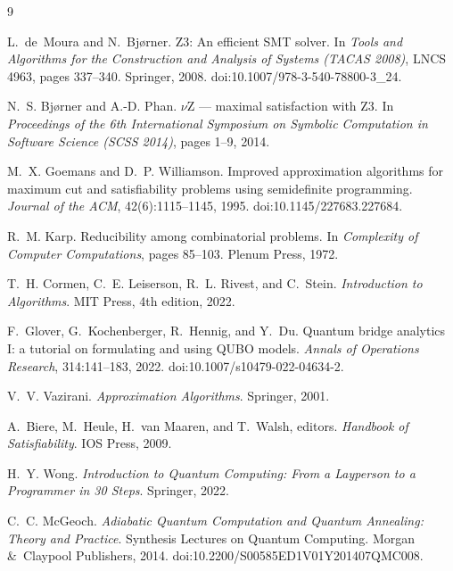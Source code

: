 \documentclass[12pt, a4paper]{article}
\theoremstyle{remark}
\begin{document}
\begin{thebibliography}{9}

L.~de~Moura and N.~Bj{\o}rner.
\newblock Z3: An efficient {SMT} solver.
\newblock In \textit{Tools and Algorithms for the Construction and Analysis of
  Systems (TACAS 2008)}, LNCS 4963, pages 337--340. Springer, 2008.
\newblock doi:10.1007/978-3-540-78800-3\_24.

N.~S. Bj{\o}rner and A.-D. Phan.
\newblock $\nu${Z} --- maximal satisfaction with {Z3}.
\newblock In \textit{Proceedings of the 6th International Symposium on
  Symbolic Computation in Software Science (SCSS 2014)}, pages 1--9, 2014.

M.~X. Goemans and D.~P. Williamson.
\newblock Improved approximation algorithms for maximum cut and satisfiability
  problems using semidefinite programming.
\newblock \textit{Journal of the ACM}, 42(6):1115--1145, 1995.
\newblock doi:10.1145/227683.227684.

R.~M. Karp.
\newblock Reducibility among combinatorial problems.
\newblock In \textit{Complexity of Computer Computations}, pages 85--103.
  Plenum Press, 1972.

T.~H. Cormen, C.~E. Leiserson, R.~L. Rivest, and C.~Stein.
\newblock \textit{Introduction to Algorithms}.
\newblock MIT Press, 4th edition, 2022.

F.~Glover, G.~Kochenberger, R.~Hennig, and Y.~Du.
\newblock Quantum bridge analytics {I}: a tutorial on formulating and using
  {QUBO} models.
\newblock \textit{Annals of Operations Research}, 314:141--183, 2022.
\newblock doi:10.1007/s10479-022-04634-2.

V.~V. Vazirani.
\newblock \textit{Approximation Algorithms}.
\newblock Springer, 2001.

A.~Biere, M.~Heule, H.~van Maaren, and T.~Walsh, editors.
\newblock \textit{Handbook of Satisfiability}.
\newblock IOS Press, 2009.

H.~Y. Wong.
\newblock \textit{Introduction to Quantum Computing: From a Layperson to a
  Programmer in 30 Steps}.
\newblock Springer, 2022.

C.~C. McGeoch.
\newblock \textit{Adiabatic Quantum Computation and Quantum Annealing: Theory
  and Practice}.
\newblock Synthesis Lectures on Quantum Computing. Morgan \&\ Claypool
  Publishers, 2014.
\newblock doi:10.2200/S00585ED1V01Y201407QMC008.


\end{thebibliography}
\end{document}
